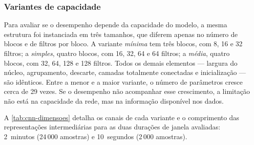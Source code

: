 \begin{figure}[h!]
{
	}{
	}
\end{figure}

\subsubsection{Variantes de capacidade}
\label{subsubsec:fund-cnn-variantes}

Para avaliar se o desempenho depende da capacidade do modelo, a mesma
estrutura foi instanciada em três tamanhos, que diferem apenas no número de
blocos e de filtros por bloco. A variante \textit{mínima} tem três blocos,
com 8, 16 e 32 filtros; a \textit{simples}, quatro blocos, com 16, 32, 64 e
64 filtros; a \textit{média}, quatro blocos, com 32, 64, 128 e 128 filtros.
Todos os demais elementos --- largura do núcleo, agrupamento, descarte,
camadas totalmente conectadas e inicialização --- são idênticos. Entre a menor e a maior
variante, o número de parâmetros cresce cerca de 29 vezes. Se o desempenho
não acompanhar esse crescimento, a limitação não está na capacidade da
rede, mas na informação disponível nos dados.

A \autoref{tab:cnn-dimensoes} detalha os canais de cada variante e o
comprimento das representações intermediárias para as duas durações de
janela avaliadas: 2~minutos (24\,000 amostras) e 10~segundos (2\,000
amostras).

